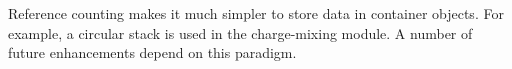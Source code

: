Reference counting makes it much simpler to store data in container
objects. For example, a circular stack is used in the charge-mixing
module. A number of future enhancements depend on this paradigm.


\clearpage
{}



\clearpage
{}
\printindex

\printindex[sfiles]
\printindex[sfdf]







